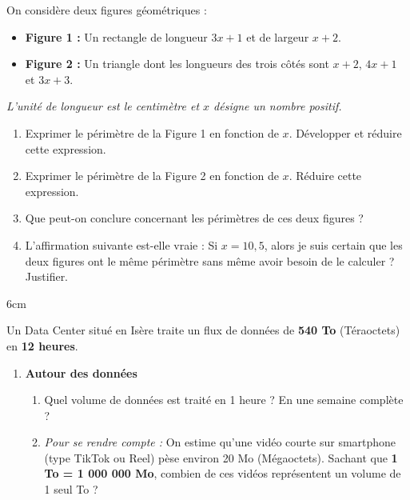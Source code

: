\documentclass[a4paper]{book}
\begin{document}
{    
\newpage
    
    
    \begin{exercice}
        On considère deux figures géométriques :
        \begin{itemize}
            \item \textbf{Figure 1 :} Un rectangle de longueur $3x + 1$ et de largeur $x + 2$.
            \item \textbf{Figure 2 :} Un triangle dont les longueurs des trois côtés sont $x + 2$, $4x + 1$ et $3x + 3$.
        \end{itemize}
        \textit{L'unité de longueur est le centimètre et $x$ désigne un nombre positif.}
        
        \begin{enumerate}
            \item Exprimer le périmètre de la Figure 1 en fonction de $x$. Développer et réduire cette expression.
            \item Exprimer le périmètre de la Figure 2 en fonction de $x$. Réduire cette expression.
            \item Que peut-on conclure concernant les périmètres de ces deux figures ? 
            \item L'affirmation suivante est-elle vraie : \og Si $x = 10,5$, alors je suis certain que les deux figures ont le même périmètre sans même avoir besoin de le calculer \fg{} ? Justifier.
        \end{enumerate}
        \begin{ZoneReponse}{6cm}
        \end{ZoneReponse}
    \end{exercice}
    
        
    \begin{exercice} 
        Un Data Center situé en Isère traite un flux de données de \textbf{540 To} (Téraoctets) en \textbf{12 heures}.
        
        \begin{enumerate}
            \item \textbf{Autour des données}
            \begin{enumerate}
                \item Quel volume de données est traité en 1 heure ? En une semaine complète ?
                \item \textit{Pour se rendre compte :} On estime qu'une vidéo courte sur smartphone (type TikTok ou Reel) pèse environ 20 Mo (Mégaoctets). Sachant que \textbf{1 To = 1 000 000 Mo}, combien de ces vidéos représentent un volume de 1 seul To ?
            \end{enumerate}
            

\end{enumerate}
\end{exercice}}
\end{document}
